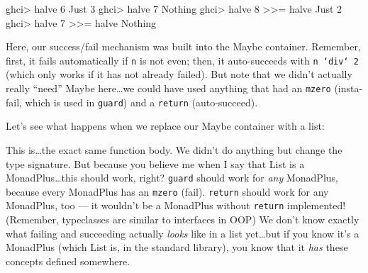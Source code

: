 \documentclass[]{article}
\newenvironment{Shaded}{}{}
\newcommand{\KeywordTok}[1]{\textcolor[rgb]{0.00,0.44,0.13}{\textbf{{#1}}}}
\newcommand{\DataTypeTok}[1]{\textcolor[rgb]{0.56,0.13,0.00}{{#1}}}
\newcommand{\DecValTok}[1]{\textcolor[rgb]{0.25,0.63,0.44}{{#1}}}
\newcommand{\CommentTok}[1]{\textcolor[rgb]{0.38,0.63,0.69}{\textit{{#1}}}}
\newcommand{\OtherTok}[1]{\textcolor[rgb]{0.00,0.44,0.13}{{#1}}}
\newcommand{\FunctionTok}[1]{\textcolor[rgb]{0.02,0.16,0.49}{{#1}}}
\newcommand{\NormalTok}[1]{{#1}}
\begin{document}
\begin{Shaded}
\begin{Highlighting}[]
\NormalTok{ghci}\FunctionTok{>} \NormalTok{halve }\DecValTok{6}
\DataTypeTok{Just} \DecValTok{3}
\NormalTok{ghci}\FunctionTok{>} \NormalTok{halve }\DecValTok{7}
\DataTypeTok{Nothing}
\NormalTok{ghci}\FunctionTok{>} \NormalTok{halve }\DecValTok{8} \FunctionTok{>>=} \NormalTok{halve}
\DataTypeTok{Just} \DecValTok{2}
\NormalTok{ghci}\FunctionTok{>} \NormalTok{halve }\DecValTok{7} \FunctionTok{>>=} \NormalTok{halve}
\DataTypeTok{Nothing}
\end{Highlighting}
\end{Shaded}

Here, our success/fail mechanism was built into the Maybe container.
Remember, first, it fails automatically if \texttt{n} is not even; then,
it auto-succeeds with \texttt{n\ `div`\ 2} (which only works if it has
not already failed). But note that we didn't actually really ``need''
Maybe here\ldots{}we could have used anything that had an \texttt{mzero}
(insta-fail, which is used in \texttt{guard}) and a \texttt{return}
(auto-succeed).

Let's see what happens when we replace our Maybe container with a list:

\begin{Shaded}
\end{Shaded}

This is\ldots{}the exact same function body. We didn't do anything but
change the type signature. But because you believe me when I say that
List is a MonadPlus\ldots{}this should work, right? \texttt{guard}
should work for \emph{any} MonadPlus, because every MonadPlus has an
\texttt{mzero} (fail). \texttt{return} should work for any MonadPlus,
too --- it wouldn't be a MonadPlus without \texttt{return} implemented!
(Remember, typeclasses are similar to interfaces in OOP) We don't know
exactly what failing and succeeding actually \emph{looks} like in a list
yet\ldots{}but if you know it's a MonadPlus (which List is, in the
standard library), you know that it \emph{has} these concepts defined
somewhere.
\end{document}
